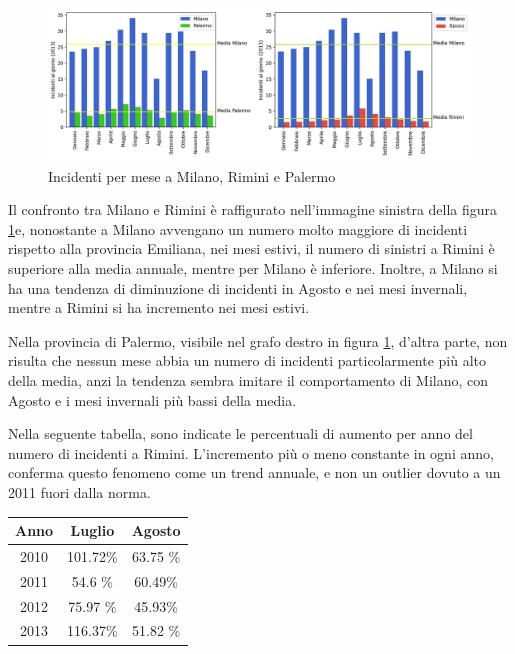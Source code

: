 \documentclass[a4paper,12pt]{report}
\begin{document}
\begin{figure}
    \includegraphics[width=\linewidth]{img_unite/milano_rimini_palermo.png}
    \caption{Incidenti per mese a Milano, Rimini e Palermo}
    \label{fig:milano-rimini}
\end{figure}

Il confronto tra Milano e Rimini è raffigurato nell'immagine sinistra della 
figura \ref{fig:milano-rimini}e, nonostante a Milano avvengano un numero molto maggiore di 
incidenti rispetto alla provincia Emiliana, nei mesi estivi, 
il numero di sinistri a Rimini è superiore alla media annuale, 
mentre per Milano è inferiore. 
Inoltre, a Milano si ha una tendenza di diminuzione di incidenti in Agosto e nei 
mesi invernali, mentre a Rimini si ha incremento nei mesi estivi.

Nella provincia di Palermo, visibile nel grafo destro in figura \ref{fig:milano-rimini}, 
d'altra parte, non risulta che nessun mese abbia un numero di incidenti 
particolarmente più alto della media, anzi la tendenza sembra imitare il comportamento di 
Milano, con Agosto e i mesi invernali più bassi della media.

Nella seguente tabella, sono indicate le percentuali di aumento per anno del numero di 
incidenti a Rimini.
L'incremento più o meno constante in ogni anno, conferma questo fenomeno come un trend 
annuale, e non un outlier dovuto a un 2011 fuori dalla norma.

\begin{center}
    \def\arraystretch{1.5}%
    \begin{tabular}{ |c|c|c| } 
    \hline
    Anno & Luglio   & Agosto \\ 
    \hline
    \rowcolor{TableGray}
    2010 & 101.72\% & 63.75 \% \\ 
    2011 & 54.6  \%  & 60.49\% \\
    \rowcolor{TableGray}
    2012 & 75.97 \%  & 45.93\%\\
    2013 & 116.37\% & 51.82 \%\\
    \hline
    \end{tabular}
\end{center}
\end{document}
